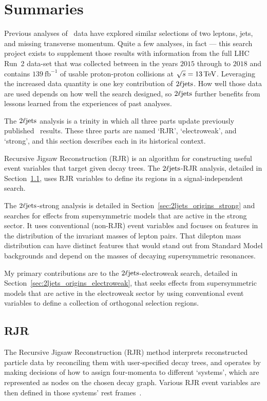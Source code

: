 \section{Summaries}
\label{sec:2ljets_context}
Previous analyses of \atlas\ data have explored similar selections of
two leptons, jets, and missing transverse momentum.
Quite a few analyses, in fact ---
this search project exists to supplement those results with information from
the full LHC Run~2 data-set that was collected between in the years $2015$
through to $2018$ and contains
$139~\mathrm{fb}^{-1}$ of usable proton-proton collisions at
$\sqrt{s} = 13\,\eV[T]$.
Leveraging the increased data quantity is one key contribution of $\twoljets$.
How well those data are used depends on how well the search designed, so
$\twoljets$ further benefits from lessons learned from the experiences of
past analyses.

The $\twoljets$ analysis is a trinity in which all three parts update
previously published \atlas\ results.
These three parts are named `RJR', `electroweak', and `strong',
and this section describes each in its historical context.

Recursive Jigsaw Reconstruction (RJR) is an algorithm for constructing useful
event variables that target given decay trees.
The $\twoljets$-RJR analysis, detailed in Section~\ref{sec:2ljets_origins_rjr},
uses RJR variables to define its regions in a signal-independent search.

The $\twoljets$-strong analysis is
detailed in Section~\ref{sec:2ljets_origins_strong} and
searches for effects from supersymmetric models that are active in the strong
sector.
It uses conventional (non-RJR) event variables and focuses on features in the
distribution of the invariant masses of lepton pairs.
That dilepton mass distribution can have distinct features that would stand
out from Standard Model backgrounds and depend on the masses of decaying
supersymmetric resonances.

My primary contributions are to the $\twoljets$-electroweak search,
detailed in Section~\ref{sec:2ljets_origins_electroweak}, that seeks effects
from supersymmetric models that are active in the electroweak
sector by using conventional event variables to define a collection of
orthogonal selection regions.


\subsection{RJR}
\label{sec:2ljets_origins_rjr}
The Recursive Jigsaw Reconstruction (RJR) method interprets reconstructed
particle data by reconciling them with user-specified decay trees, and operates
by making decisions of how to assign four-momenta to different `systems',
which are represented as nodes on the chosen decay graph.
Various RJR event variables are then defined in those systems' rest
frames~\cite{jackson2017sparticles, jackson2017rjr}.

